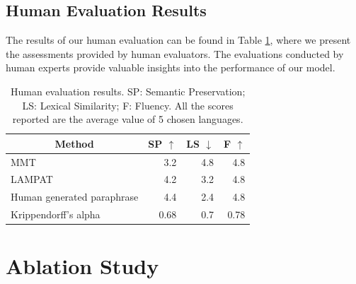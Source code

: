 \documentclass[letterpaper]{article} %
\begin{document}
\subsection{Human Evaluation Results}
The results of our human evaluation can be found in Table \ref{tab:human_eval}, where we present the assessments provided by human evaluators. The evaluations conducted by human experts provide valuable insights into the performance of our model.

\begin{table}[ht]
    \centering
    {\fontsize{9pt}{9pt}\selectfont\begin{tabular}{|l|rrr|}
        \hline
        \multicolumn{1}{|c|}{Method} & SP $\uparrow$ & LS $\downarrow$ & F $\uparrow$\\ \hline
        MMT & 3.2 & 4.8 & 4.8 \\
        LAMPAT & 4.2 & 3.2 & 4.8 \\ \hline
        Human generated paraphrase & 4.4 & 2.4 & 4.8 \\ \hline \hline
        Krippendorff's alpha & 0.68 & 0.7 & 0.78 \\ \hline
    \end{tabular}}
    \caption{Human evaluation results. SP: Semantic Preservation; LS: Lexical Similarity; F: Fluency. All the scores reported are the average value of 5 chosen languages.}
    \label{tab:human_eval}
\end{table}

\section{Ablation Study}
\label{sec:ablation_study}
\end{document}
